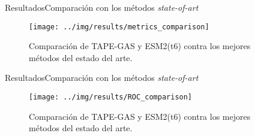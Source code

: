 \documentclass[10pt]{beamer}
\newcommand{\1}{
	\setbeamertemplate{background}{
		\texttt{[image: img/1]}
		\tikz[overlay] \fill[fill opacity=0.75,fill=white] (0,0) rectangle (-\paperwidth,\paperheight);
	}
}
\begin{document}
\begin{frame}{Resultados}{Comparación con los métodos \textit{state-of-art}}
	\begin{figure}
		\texttt{[image: ../img/results/metrics\_comparison]}
		\caption{Comparación de TAPE-GAS y ESM2(t6) contra los mejores métodos del estado del arte.}
	\end{figure}
\end{frame}

\begin{frame}{Resultados}{Comparación con los métodos \textit{state-of-art}}
	\begin{figure}
		\texttt{[image: ../img/results/ROC\_comparison]}
		\caption{Comparación de TAPE-GAS y ESM2(t6) contra los mejores métodos del estado del arte.}
	\end{figure}
\end{frame}
\end{document}
